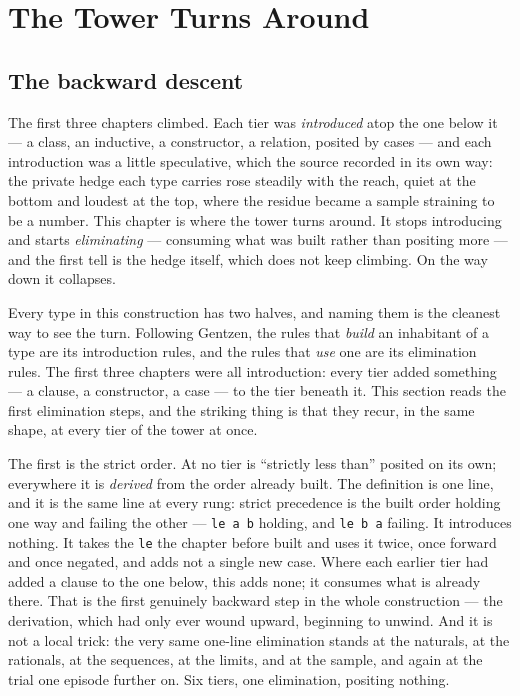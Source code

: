 \chapter{The Tower Turns Around}

\section{The backward descent}

The first three chapters climbed. Each tier was \emph{introduced} atop the one below it --- a class, an inductive, a
constructor, a relation, posited by cases --- and each introduction was a little speculative, which the source
recorded in its own way: the private hedge each type carries rose steadily with the reach, quiet at the bottom and
loudest at the top, where the residue became a sample straining to be a number. This chapter is where the tower turns
around. It stops introducing and starts \emph{eliminating} --- consuming what was built rather than positing more ---
and the first tell is the hedge itself, which does not keep climbing. On the way down it collapses.

Every type in this construction has two halves, and naming them is the cleanest way to see the turn. Following
Gentzen, the rules that \emph{build} an inhabitant of a type are its introduction rules, and the rules that \emph{use}
one are its elimination rules. The first three chapters were all introduction: every tier added something --- a
clause, a constructor, a case --- to the tier beneath it. This section reads the first elimination steps, and the
striking thing is that they recur, in the same shape, at every tier of the tower at once.

The first is the strict order. At no tier is ``strictly less than'' posited on its own; everywhere it is
\emph{derived} from the order already built. The definition is one line, and it is the same line at every rung: strict
precedence is the built order holding one way and failing the other --- \verb|le a b| holding, and \verb|le b a|
failing. It introduces nothing. It takes the \verb|le| the chapter before built and uses it twice, once forward and
once negated, and adds not a single new case. Where each earlier tier had added a clause to the one below, this adds
none; it consumes what is already there. That is the first genuinely backward step in the whole construction --- the
derivation, which had only ever wound upward, beginning to unwind. And it is not a local trick: the very same one-line
elimination stands at the naturals, at the rationals, at the sequences, at the limits, and at the sample, and again at
the trial one episode further on. Six tiers, one elimination, positing nothing.

